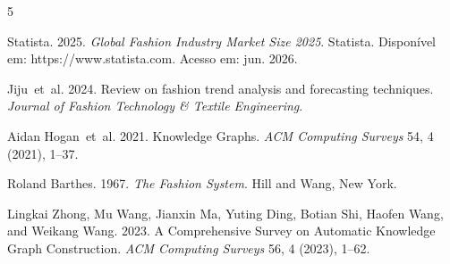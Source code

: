 \documentclass[sigconf]{acmart}
\begin{document}
\begin{thebibliography}{5}

Statista. 2025.
\newblock \textit{Global Fashion Industry Market Size 2025}.
\newblock Statista. Disponível em: https://www.statista.com. Acesso em: jun. 2026.

Jiju~et~al. 2024.
\newblock Review on fashion trend analysis and forecasting techniques.
\newblock \textit{Journal of Fashion Technology \& Textile Engineering}.

Aidan Hogan~et~al. 2021.
\newblock Knowledge Graphs.
\newblock \textit{ACM Computing Surveys} 54, 4 (2021), 1--37.

Roland Barthes. 1967.
\newblock \textit{The Fashion System}.
\newblock Hill and Wang, New York.

Lingkai Zhong, Mu Wang, Jianxin Ma, Yuting Ding, Botian Shi, Haofen Wang, and Weikang Wang. 2023.
\newblock A Comprehensive Survey on Automatic Knowledge Graph Construction.
\newblock \textit{ACM Computing Surveys} 56, 4 (2023), 1--62.

\end{thebibliography}
\end{document}
